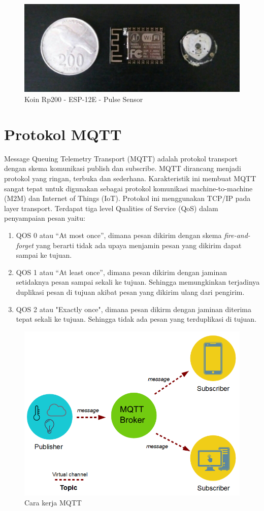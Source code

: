 \begin{figure}[H]
	\centering
	\includegraphics[scale=0.22]{images/coin_esp_pulse.jpg}
	\caption{Koin Rp200 - ESP-12E - Pulse Sensor}
	\label{fig:coin_esp_pulse}
\end{figure}

\section{Protokol MQTT}
Message Queuing Telemetry Transport (MQTT) adalah protokol transport
dengan skema komunikasi publish dan subscribe. MQTT dirancang menjadi protokol yang ringan, terbuka dan sederhana. Karakteristik ini membuat MQTT sangat tepat untuk digunakan sebagai protokol komunikasi machine-to-machine (M2M) dan Internet of Things (IoT). Protokol ini menggunakan TCP/IP pada layer transport. Terdapat tiga level Qualities of Service (QoS) dalam penyampaian pesan yaitu:
\begin{enumerate}
	\item QOS 0 atau “At most once”, dimana pesan dikirim dengan skema \textit{fire-and-forget} yang berarti tidak ada upaya menjamin pesan yang dikirim dapat sampai ke tujuan.
	\item QOS 1 atau “At least once”, dimana pesan dikirim dengan jaminan setidaknya pesan sampai sekali ke tujuan. Sehingga memungkinkan terjadinya duplikasi pesan di tujuan akibat pesan yang dikirim ulang dari pengirim.
	\item QOS 2 atau "Exactly once", dimana pesan dikirm dengan jaminan diterima tepat sekali ke tujuan. Sehingga tidak ada pesan yang terduplikasi di tujuan.	
\end{enumerate}

\begin{figure}[H]
	\centering
	\includegraphics[scale=0.45]{images/mqtt.png}
	\caption{Cara kerja MQTT}
\end{figure}

